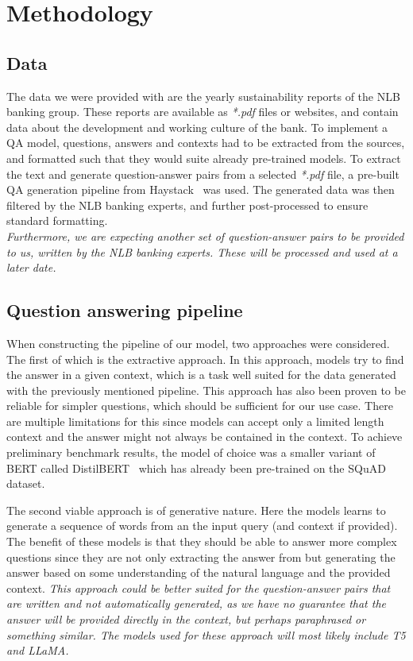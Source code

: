 \documentclass[fleqn,moreauthors,10pt]{ds_report}
\begin{document}
\section*{Methodology}
\subsection*{Data}
The data we were provided with are the yearly sustainability reports of the NLB banking group.
These reports are available as \textit{*.pdf} files or websites, and contain data about the development and working culture of the bank.
To implement a QA model, questions, answers and contexts had to be extracted from the sources, and formatted such that they would suite already pre-trained models.
To extract the text and generate question-answer pairs from a selected \textit{*.pdf} file, a pre-built QA generation pipeline from Haystack~\cite{haystack} was used.
The generated data was then filtered by the NLB banking experts, and further post-processed to ensure standard formatting.\\
{\it Furthermore, we are expecting another set of question-answer pairs to be provided to us, written by the NLB banking experts. These will be processed and used at a later date.}

\subsection*{Question answering pipeline}
When constructing the pipeline of our model, two approaches were considered.
The first of which is the extractive approach.
In this approach, models try to find the answer in a given context, which is a task well suited for the data generated with the previously mentioned pipeline.
This approach has also been proven to be reliable for simpler questions, which should be sufficient for our use case.
There are multiple limitations for this since models can accept only a limited length context and the answer might not always be contained in the context.
To achieve preliminary benchmark results, the model of choice was a smaller variant of BERT called DistilBERT~\cite{sanh2019distilbert} which has already been pre-trained on the SQuAD dataset.

The second viable approach is of generative nature.
Here the models learns to generate a sequence of words from an the input query (and context if provided).
The benefit of these models is that they should be able to answer more complex questions since they are not only extracting the answer from but generating the answer based on some understanding of the natural language and the provided context.
{\it This approach could be better suited for the question-answer pairs that are written and not automatically generated, as we have no guarantee that the answer will be provided directly in the context, but perhaps paraphrased or something similar. The models used for these approach will most likely include T5 and LLaMA.}
\end{document}
